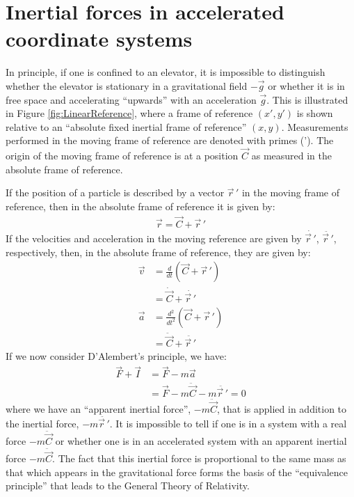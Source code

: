 \section{Inertial forces in accelerated coordinate systems}
In principle, if one is confined to an elevator, it is impossible to distinguish whether the elevator is stationary in a gravitational field $-\vec{g}$ or whether it is in free space and accelerating ``upwards'' with an acceleration $\vec{g}$. This is illustrated in Figure \ref{fig:LinearReference}, where a frame of reference $(x',y')$ is shown relative to an ``absolute fixed inertial frame of reference'' $(x,y)$. Measurements performed in the moving frame of reference are denoted with primes ('). The origin of the moving frame of reference is at a position $\vec{C}$ as measured in the absolute frame of reference.


If the position of a particle is described by a vector $\vec{r}\,'$ in the moving frame of reference, then in the absolute frame of reference it is given by:
\begin{align}
\vec{r}=\vec{C}+\vec{r}\,'
\end{align}
If the velocities and acceleration in the moving reference are given by $\dot{\vec{r}\,'}$, $\ddot{\vec{r}\,'}$, respectively, then, in the absolute frame of reference, they are given by:
\begin{align}
\vec{v}&=\frac{d}{dt}(\vec{C}+\vec{r}\,')\nonumber\\
&=\dot{\vec{C}}+\dot{\vec{r}\,'}\nonumber\\
\vec{a}&=\frac{d^2}{dt^2}(\vec{C}+\vec{r}\,')\nonumber\\
&=\ddot{\vec{C}}+\ddot{\vec{r}\,'}\nonumber
\end{align}
If we now consider D'Alembert's principle, we have:
\begin{align}
\vec{F}+\vec{I}&=\vec{F}-m\vec{a} \nonumber\\
&=\vec{F}-m\ddot{\vec{C}}-m\ddot{\vec{r}\,'}=0
\end{align}
where we have an ``apparent inertial force'', $-m\ddot{\vec{C}}$, that is applied in addition to the inertial force, $-m\ddot{\vec{r}\,'}$. It is impossible to tell if one is in a system with a real force $-m\ddot{\vec{C}}$ or whether one is in an accelerated system with an apparent inertial force $-m\ddot{\vec{C}}$. The fact that this inertial force is proportional to the same mass as that which appears in the gravitational force forms the basis of the ``equivalence principle'' that leads to the General Theory of Relativity.


